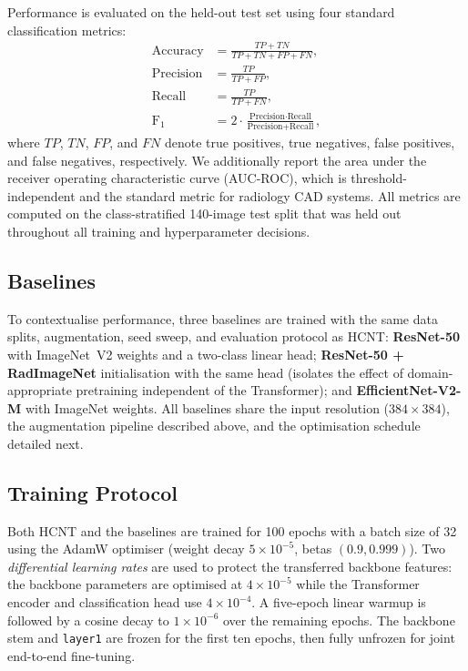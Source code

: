\documentclass[conference]{IEEEtran}
\newcommand{\HCNT}{\textsc{HCNT}\xspace}
\begin{document}
Performance is evaluated on the held-out test set using four standard
classification metrics:
\begin{align}
  \text{Accuracy}  &= \frac{TP + TN}{TP + TN + FP + FN}, \label{eq:acc}\\[4pt]
  \text{Precision} &= \frac{TP}{TP + FP}, \label{eq:prec}\\[4pt]
  \text{Recall}    &= \frac{TP}{TP + FN}, \label{eq:rec}\\[4pt]
  \text{F}_1       &= 2\cdot\frac{\text{Precision}\cdot\text{Recall}}
                              {\text{Precision}+\text{Recall}}, \label{eq:f1}
\end{align}
where $TP$, $TN$, $FP$, and $FN$ denote true positives, true negatives,
false positives, and false negatives, respectively. We additionally report
the area under the receiver operating characteristic curve (AUC-ROC), which
is threshold-independent and the standard metric for radiology CAD systems.
All metrics are computed on the class-stratified 140-image test split that
was held out throughout all training and hyperparameter decisions.

\subsection{Baselines}

To contextualise performance, three baselines are trained with the same
data splits, augmentation, seed sweep, and evaluation protocol as \HCNT:
\textbf{ResNet-50} \cite{he2016} with ImageNet~V2 weights and a two-class
linear head; \textbf{ResNet-50 + RadImageNet} initialisation with the same
head (isolates the effect of domain-appropriate pretraining independent of
the Transformer); and \textbf{EfficientNet-V2-M} \cite{tan2021efficientnetv2}
with ImageNet weights. All baselines share the input resolution
($384\!\times\!384$), the augmentation pipeline described above, and the
optimisation schedule detailed next.

\subsection{Training Protocol}

Both \HCNT and the baselines are trained for 100 epochs with a batch size
of 32 using the AdamW optimiser (weight decay $5\!\times\!10^{-5}$, betas
$(0.9, 0.999)$). Two \emph{differential learning rates} are used to protect
the transferred backbone features: the backbone parameters are optimised at
$4\!\times\!10^{-5}$ while the Transformer encoder and classification head
use $4\!\times\!10^{-4}$. A five-epoch linear warmup is followed by a
cosine decay to $1\!\times\!10^{-6}$ over the remaining epochs. The
backbone stem and \texttt{layer1} are frozen for the first ten epochs, then
fully unfrozen for joint end-to-end fine-tuning.
\end{document}
